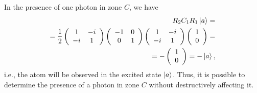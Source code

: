 In the presence of one photon in zone $C$, we have
\begin{eqnarray}
  R_2 C_1 R_1 \ket{a} =
  \nonumber \\
  =
  \frac{1}{2}
  \left(
  \begin{array} {cc}
    1 & -i
    \\
    -i & 1 
  \end{array}
  \right)
  \left(
  \begin{array} {cc}
    -1 & 0
    \\
    0 & 1 
  \end{array}
  \right)
  \left(
  \begin{array} {cc}
    1 & -i
    \\
    -i & 1 
  \end{array}
  \right)
  \left(
  \begin{array} {c}
    1
    \\
    0
  \end{array}
  \right) =
  \nonumber \\
  =
  - 
  \left(
  \begin{array} {c}
    1
    \\
    0
  \end{array}
  \right) =
  - \ket{a},
  \nonumber
\end{eqnarray}
i.e., the atom will be observed in the excited state $\ket{a}$. Thus, it is possible to determine the presence of a photon in zone $C$ without destructively affecting it.